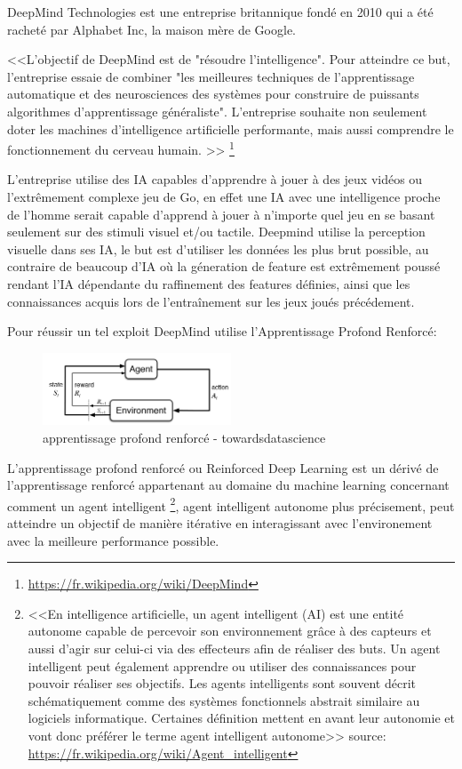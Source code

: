 DeepMind Technologies est une entreprise britannique fondé en 2010 qui a été 
racheté par Alphabet Inc, la maison mère de Google. \newline

<<L’objectif de DeepMind est de "résoudre l'intelligence". Pour atteindre ce but, 
l'entreprise essaie de combiner "les meilleures techniques de l'apprentissage automatique et
des neurosciences des systèmes pour construire de puissants algorithmes d'apprentissage généraliste". 
L'entreprise souhaite non seulement doter les machines d'intelligence artificielle performante, 
mais aussi comprendre le fonctionnement du cerveau humain. >>
\footnote{\url{https://fr.wikipedia.org/wiki/DeepMind}} \newline

L'entreprise utilise des IA capables d'apprendre à jouer à des jeux vidéos ou l'extrêmement complexe 
jeu de Go, en effet une IA avec une intelligence proche de l'homme serait capable d'apprend à jouer 
à n'importe quel jeu en se basant seulement sur des stimuli visuel et/ou tactile. Deepmind utilise 
la perception visuelle dans ses IA, le but est d'utiliser les données les plus brut possible,
au contraire de beaucoup d'IA où la géneration de feature est extrêmement poussé rendant l'IA 
dépendante du raffinement des features définies, ainsi que les connaissances acquis lors de l'entraînement
sur les jeux joués précédement. \newline

Pour réussir un tel exploit DeepMind utilise l'Apprentissage Profond Renforcé:

\begin{figure}[H]
    \centering
    \includegraphics[width=0.5\textwidth]{Images/reinforceddeeplearning}
    \caption{apprentissage profond renforcé - towardsdatascience}
    \label{fig:reinforceddeeplearning}
\end{figure}

L'apprentissage profond renforcé ou Reinforced Deep Learning est un dérivé de l'apprentissage 
renforcé appartenant au domaine du machine learning concernant comment un agent intelligent
\footnote{<<En intelligence artificielle, un agent intelligent (AI) est une entité autonome capable de 
percevoir son environnement grâce à des capteurs et aussi d'agir sur celui-ci via des effecteurs 
afin de réaliser des buts. 
Un agent intelligent peut également apprendre ou utiliser des connaissances pour pouvoir réaliser
 ses objectifs. Les agents intelligents sont souvent décrit schématiquement comme des systèmes fonctionnels abstrait 
similaire au logiciels informatique. Certaines définition mettent en avant leur autonomie 
et vont donc préférer le terme agent intelligent autonome>> \newline
source: \url{https://fr.wikipedia.org/wiki/Agent_intelligent}},
agent intelligent autonome plus précisement, peut atteindre un objectif de manière itérative en 
interagissant avec l'environement avec la meilleure performance possible.

